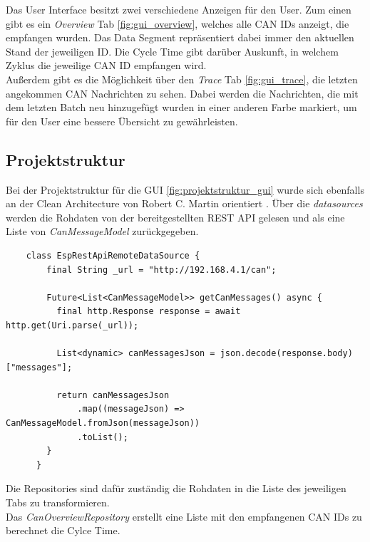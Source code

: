 Das User Interface besitzt zwei verschiedene Anzeigen für den User. Zum einen gibt es ein \textit{Overview} Tab \ref{fig:gui_overview}, welches alle CAN IDs anzeigt, die empfangen wurden. Das Data Segment repräsentiert dabei immer den aktuellen Stand der jeweiligen ID. Die Cycle Time gibt darüber Auskunft, in welchem Zyklus die jeweilige CAN ID empfangen wird. \\
Außerdem gibt es die Möglichkeit über den \textit{Trace} Tab \ref{fig:gui_trace}, die letzten angekommen CAN Nachrichten zu sehen. Dabei werden die Nachrichten, die mit dem letzten Batch neu hinzugefügt wurden in einer anderen Farbe markiert, um für den User eine bessere Übersicht zu gewährleisten.

\subsection{Projektstruktur}
Bei der Projektstruktur für die GUI \ref{fig:projektstruktur_gui} wurde sich ebenfalls an der Clean Architecture von Robert C. Martin orientiert \cite{martin_clean_2018}.
Über die \textit{datasources} werden die Rohdaten von der bereitgestellten REST API gelesen und als eine Liste von \textit{CanMessageModel} zurückgegeben.
\begin{lstlisting}
    class EspRestApiRemoteDataSource {
        final String _url = "http://192.168.4.1/can";
      
        Future<List<CanMessageModel>> getCanMessages() async {
          final http.Response response = await http.get(Uri.parse(_url));
      
          List<dynamic> canMessagesJson = json.decode(response.body)["messages"];
      
          return canMessagesJson
              .map((messageJson) => CanMessageModel.fromJson(messageJson))
              .toList();
        }
      }      
\end{lstlisting}
Die Repositories sind dafür zuständig die Rohdaten in die Liste des jeweiligen Tabs zu transformieren. \\
Das \textit{CanOverviewRepository} erstellt eine Liste mit den empfangenen CAN IDs zu berechnet die Cylce Time.
